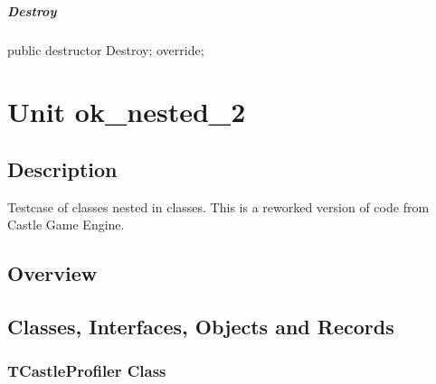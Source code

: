 \documentclass{report}
\newif\ifpdf
\begin{document}
\paragraph*{Destroy}\hspace*{\fill}

\label{ok_nested_1.TRepoSoundEngine-Destroy}
\begin{list}{}{
\setlength{\itemindent}{0cm}
\setlength{\listparindent}{0cm}
\setlength{\leftmargin}{\evensidemargin}
\addtolength{\leftmargin}{\tmplength}
\settowidth{\labelsep}{X}
\addtolength{\leftmargin}{\labelsep}
\setlength{\labelwidth}{\tmplength}
}
\item[\textbf{Declaration}\hfill]
\ifpdf
\begin{flushleft}
\fi
\begin{ttfamily}
public destructor Destroy; override;\end{ttfamily}

\ifpdf
\end{flushleft}
\fi

\end{list}
\chapter{Unit ok{\_}nested{\_}2}
\label{ok_nested_2}
\section{Description}
Testcase of classes nested in classes. This is a reworked version of code from Castle Game Engine.
\section{Overview}
\begin{description}
\item[\texttt{\begin{ttfamily}TCastleProfiler\end{ttfamily} Class}]
\end{description}
\section{Classes, Interfaces, Objects and Records}
\ifpdf
\subsection*{\large{\textbf{TCastleProfiler Class}}\normalsize\hspace{1ex}\hrulefill}
\else
\end{document}
